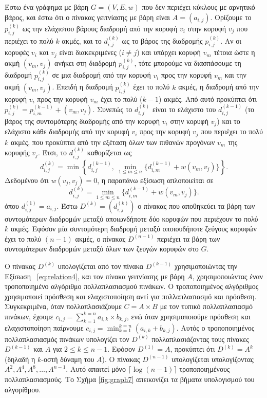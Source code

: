 \documentclass[12pt,a4paper]{article}
\begin{document}
Έστω ένα γράφημα με βάρη $G = (V,E,w)$ που δεν περιέχει κύκλους με αρνητικό βάρος, και έστω ότι ο πίνακας γειτνίασης με βάρη είναι $A = (a_{i,j})$. Ορίζουμε το $p_{i,j}^{(k)}$ ως την ελάχιστου βάρους διαδρομή από την κορυφή $v_i$ στην κορυφή $v_j$ που περιέχει το πολύ $k$ ακμές, και το $d_{i,j}^{(k)}$ ως το βάρος της διαδρομής $p_{i,j}^{(k)}$. Αν οι κορυφές $v_i$ και $v_j$ είναι διακεκριμένες ($i\neq j$) και υπάρχει κορυφή $v_m$ τέτοια ώστε η ακμή $(v_m,v_j)$ ανήκει στη διαδρομή $p_{i,j}^{(k)}$, τότε μπορούμε να διασπάσουμε τη διαδρομή $p_{i,j}^{(k)}$ σε μια διαδρομή από την κορυφή $v_i$ προς την κορυφή $v_m$ και την ακμή $(v_m,v_j)$. Επειδή η διαδρομή $p_{i,j}^{(k)}$ έχει το πολύ $k$ ακμές, η διαδρομή από την κορυφή $v_i$ προς την κορυφή $v_m$ έχει το πολύ ($k-1$) ακμές. Από αυτό προκύπτει ότι $p_{i,j}^{(k)} = p_{i,m}^{(k-1)} + (v_m,v_j)$. Συνεπώς το $d_{i,j}^{(k)}$ είναι το ελάχιστο του $d_{i,j}^{(k-1)}$ (το βάρος της συντομότερης διαδρομής από την κορυφή $v_i$ στην κορυφή $v_j$) και το ελάχιστο κάθε διαδρομής από την κορυφή $v_i$ προς την κορυφή $v_j$ που περιέχει το πολύ $k$ ακμές, που προκύπτει από την εξέταση όλων των πιθανών προγόνων $v_m$ της κορυφής $v_j$. Έτσι, το $d_{i,j}^{(k)}$ καθορίζεται ως
\[
d_{i,j}^{(k)} = \min\left\{ d_{i,j}^{(k-1)},\ \min_{1\le m\le n} \{ d_{i,m}^{(k-1)} + w(v_m,v_j)\} \right\}.
\]
Δεδομένου ότι $w(v_j,v_j)=0$, η παραπάνω εξίσωση απλοποιείται σε
\begin{equation}
d_{i,j}^{(k)} = \min_{1\le m\le n} \{ d_{i,m}^{(k-1)} + w(v_m,v_j)\}.
\label{eq:relation4}
\end{equation}
όπου $d_{i,j}^{(1)}=a_{i,j}$. Έστω $D^{(k)}=(d_{i,j}^{(k)})$ ο πίνακας που αποθηκεύει τα βάρη των συντομότερων διαδρομών μεταξύ οποιωνδήποτε δύο κορυφών που περιέχουν το πολύ $k$ ακμές. Εφόσον μία συντομότερη διαδρομή μεταξύ οποιουδήποτε ζεύγους κορυφών έχει το πολύ $(n-1)$ ακμές, ο πίνακας $D^{(n-1)}$ περιέχει τα βάρη των συντομότερων διαδρομών μεταξύ όλων των ζευγών κορυφών στο $G$.

Ο πίνακας $D^{(k)}$ υπολογίζεται από τον πίνακα $D^{(k-1)}$ χρησιμοποιώντας την Εξίσωση ~\ref{eq:relation4}, και τον πίνακα γειτνίασης με βάρη $A$, χρησιμοποιώντας έναν τροποποιημένο αλγόριθμο πολλαπλασιασμού πινάκων. Ο τροποποιημένος αλγόριθμος χρησιμοποιεί πρόσθεση και ελαχιστοποίηση αντί για πολλαπλασιασμό και πρόσθεση. Συγκεκριμένα, όταν πολλαπλασιάζουμε $C = A \times B$ με τον τυπικό πολλαπλασιασμό πινάκων, έχουμε $c_{i,j} = \sum_{k=1}^{k=n} a_{i,k}\times b_{k,j}$, ενώ όταν χρησιμοποιούμε πρόσθεση και ελαχιστοποίηση παίρνουμε $c_{i,j}=\min_{k=1}^{k=n} (a_{i,k} + b_{k,j})$.
Αυτός ο τροποποιημένος πολλαπλασιασμός πινάκων υπολογίζει τον $D^{(k)}$ πολλαπλασιάζοντας τους πίνακες $D^{(k-1)}$ και $A$ για $2\le k\le n-1$. Εφόσον $D^{(1)}=A$, προκύπτει ότι $D^{(k)}=A^k$ (δηλαδή η $k$-οστή δύναμη του $A$). Ο πίνακας $D^{(n-1)}$ υπολογίζεται υπολογίζοντας $A^2, A^4, A^8, \dots, A^{n-1}$. Αυτό απαιτεί μόνο $\lceil\log(n-1)\rceil$ τροποποιημένους πολλαπλασιασμούς. Το Σχήμα \ref{fig:graph7} απεικονίζει τα βήματα υπολογισμού του αλγορίθμου.
\end{document}
